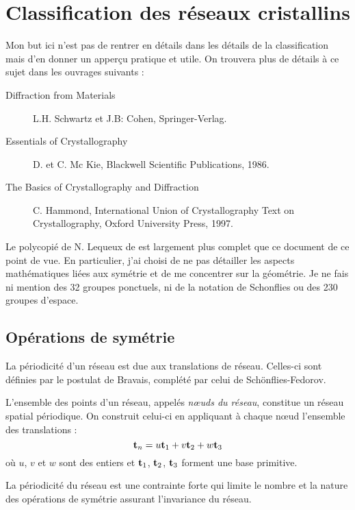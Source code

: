 \chapter{Classification des réseaux cristallins}
\label{ch:classification}

Mon but ici n'est pas de rentrer en détails dans les détails de la classification
mais d'en donner un apperçu pratique et utile. On trouvera plus de détails à ce
sujet dans les ouvrages suivants :
\begin{description}
    \item[Diffraction from Materials] L.H. Schwartz et J.B: Cohen,
        Springer-Verlag.
    \item[Essentials of Crystallography] D. et C. Mc Kie, Blackwell Scientific
        Publications, 1986.
    \item[The Basics of Crystallography and Diffraction] C. Hammond,
        International Union of Crystallography Text on Crystallography, Oxford
        University Press, 1997.
\end{description}

Le polycopié de N. Lequeux de \pc est largement plus complet que ce document de ce
point de vue. En particulier, j'ai choisi de ne pas détailler les aspects
mathématiques liées aux symétrie et de me concentrer sur la géométrie. Je ne fais ni
mention des 32 groupes ponctuels, ni de la notation de Schonflies ou des 230 groupes
d'espace.

\section{Opérations de symétrie}

La périodicité d'un réseau est due aux translations de réseau. Celles-ci sont
définies par le postulat de Bravais, complété par celui de Schönflies-Fedorov.

L'ensemble des points d'un réseau, appelés \emph{nœuds du réseau}, constitue un
réseau spatial périodique. On construit celui-ci en appliquant à chaque nœud
l'ensemble des translations :
\begin{equation}
\mathbf{t}_n = u \mathbf{t}_1 + v \mathbf{t}_2 + w \mathbf{t}_3
\end{equation}
où $u$, $v$ et $w$ sont des entiers et $\mathbf{t}_1$, $\mathbf{t}_2$, $\mathbf{t}_3$
forment une base primitive.

La périodicité du réseau est une contrainte forte qui limite le nombre et la nature des opérations de symétrie assurant l'invariance du réseau.

